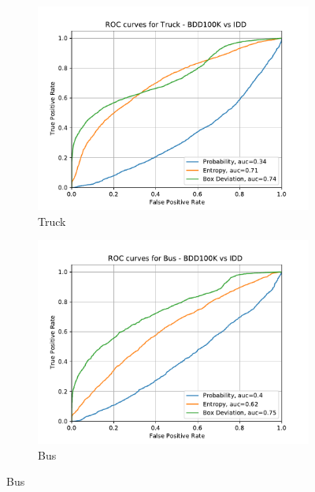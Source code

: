     \begin{figure}[H] \ContinuedFloat
    	\begin{subfigure}[t]{0.495\textwidth}
    		\centering
    		\includegraphics[width=\textwidth]{images/ROC/truck_ROC_bdd_vs_idd_Score_using_subens.pdf}
    		\caption{Truck}
    	\end{subfigure}
    	\begin{subfigure}[t]{0.495\textwidth}
    		\centering
    		\includegraphics[width=\textwidth]{images/ROC/bus_ROC_bdd_vs_idd_Score_using_subens.pdf}
    		\caption{Bus}
    	\end{subfigure}
        

\end{figure}
